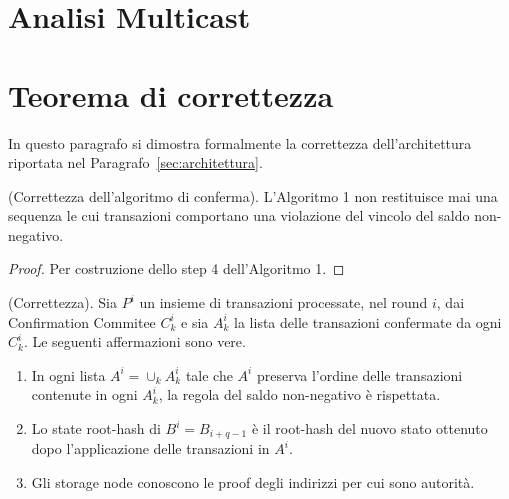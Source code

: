 \section{Analisi Multicast}

\section{Teorema di correttezza}

In questo paragrafo si dimostra formalmente la correttezza dell'architettura riportata nel Paragrafo~\ref{sec:architettura}.

\begin{lemma}{(Correttezza dell'algoritmo di conferma).}\label{lemma:cc}
L'Algoritmo 1 non restituisce mai una sequenza le cui transazioni comportano una violazione del vincolo del saldo non-negativo.
\end{lemma}


\begin{proof}
Per costruzione dello step 4 dell'Algoritmo 1.
\end{proof}


\begin{theorem}{(Correttezza).}
Sia $P^i$ un insieme di transazioni processate, nel round $i$, dai Confirmation Commitee $C_k^i$ e sia $A_k^i$ la lista delle transazioni confermate da ogni $C_k^i$. Le seguenti affermazioni sono vere.

\begin{enumerate}
	\item In ogni lista $A^i = \cup_k A_k^i$ tale che $A^i$ preserva l'ordine delle transazioni contenute in ogni $A_k^i$, la regola del saldo non-negativo è rispettata.
	\item Lo state root-hash di $B^i = B_{i+q-1}$ è il root-hash del nuovo stato ottenuto dopo l'applicazione delle transazioni in $A^i$.
	\item Gli storage node conoscono le proof degli indirizzi per cui sono autorità.
\end{enumerate}

\end{theorem}


